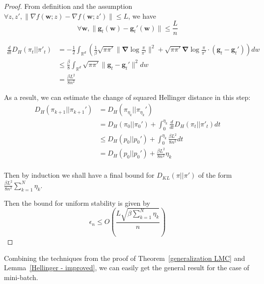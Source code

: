 \documentclass[final,12pt]{colt2018} %
\begin{document}
\begin{proof}
From definition and the assumption $\forall z,z', \|\nabla f(\bm{w};z)-\nabla f(\bm{w};z')\|\le L$, we have
\begin{equation}
  \forall \bm{w},\|\bm{g}_t(\bm{w})-\bm{g}_t'(\bm{w})\|\le \frac{L}{n}
\end{equation}

\begin{align*}
\frac{d}{dt}D_{H}(\pi_t||\pi'_t)&=-\frac{1}{2}\int_{\mathbb{R}^d} \left(\frac{1}{ \beta}\sqrt{\pi \pi'}\|\bm{\nabla}\log \frac{\pi}{\pi'}\|^2 + \sqrt{\pi \pi'}\bm{\nabla}\log \frac{\pi}{\pi'}\cdot(\bm{g}_t-\bm{g}_t')\right)dw\\
&\le \frac{\beta}{8} \int_{\mathbb{R}^d} \sqrt{\pi \pi'}\|\bm{g}_t-\bm{g}_t'\|^2dw\\
&=\frac{\beta L^2}{8n^2}
\end{align*}

As a result, we can estimate the change of squared Hellinger distance in this step:
\begin{align*}
D_H(\pi_{k+1}||\pi_{k+1}')&=D_H(\pi_{\eta_k}||\pi_{\eta_k}')\\
&=D_H(\pi_{0}||\pi_{0}')+\int_0^{\eta_k} \frac{d}{dt}D_{H}(\pi_t||\pi'_t)dt\\
&\le D_H(p_{0}||p_0')+\int_0^{\eta_k} \frac{\beta L^2}{8n^2}dt\\
&= D_H(p_{0}||p_0')+ \frac{\beta L^2}{8n^2}\eta_k\\
\end{align*}

Then by induction we shall have a final bound for $D_{KL}(\pi||\pi')$ of the form $\frac{\beta L^2}{8n^2}\sum\limits_{k=1}^N \eta_k $.

Then the bound for uniform stability is given by
\begin{equation}
  \epsilon_n\leq O\left(\frac{L\sqrt{\beta\sum_{k=1}^N \eta_k}}{n}\right)
\end{equation}
\end{proof}
Combining the techniques from the proof of Theorem~\ref{generalization LMC} and Lemma~\ref{Hellinger - improved}, we can easily get the general result for the case of mini-batch.
\end{document}
